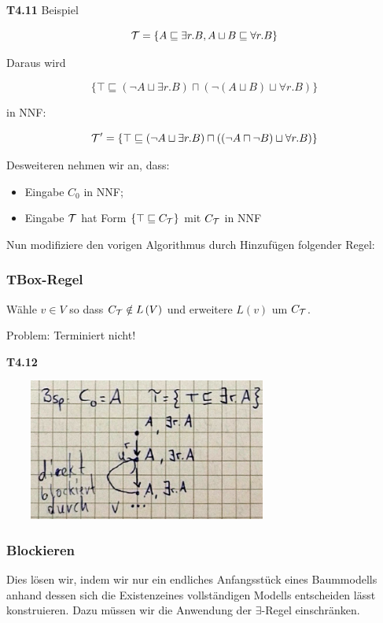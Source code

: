 \textbf{T4.11} Beispiel

$$\mathcal{T} = \{A \sqsubseteq \exists r.B, A \sqcup B \sqsubseteq \forall r.B\}$$

Daraus wird

$$\{\top \sqsubseteq (\neg A \sqcup \exists r.B) \sqcap (\neg (A \sqcup B) \sqcup \forall r.B)\}$$

in NNF:

$$\mathcal{T}' = \{\top \sqsubseteq (\neg A \sqcup \exists r.B) \sqcap ((\neg A \sqcap \neg B) \sqcup \forall r.B)\}$$

Desweiteren nehmen wir an, dass:

\begin{itemize}
	\item Eingabe $C_0$ in NNF;
	\item Eingabe $\mathcal{T}$ hat Form $\{\top \sqsubseteq C_{\mathcal{T}}\}$ mit $C_{\mathcal{T}}$ in NNF
\end{itemize}

Nun modifiziere den vorigen Algorithmus durch Hinzufügen folgender Regel:

\subsubsection{TBox-Regel}\label{tbox-regel}

Wähle $v \in V$ so dass $C_{\mathcal{T}} \notin L\left( V \right)$ und
erweitere $L\left( v \right)$ um $C_{\mathcal{T}}$.

Problem: Terminiert nicht!

\textbf{T4.12}

\includegraphics[width=3.71910in,height=1.83200in]{media/412endl.png}

\subsubsection{Blockieren}\label{blockieren}

Dies lösen wir, indem wir nur ein endliches Anfangsstück eines Baummodells anhand dessen sich die Existenzeines vollständigen Modells entscheiden lässt konstruieren. Dazu müssen wir die Anwendung der $\exists$-Regel einschränken.

